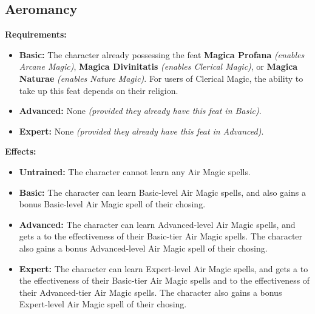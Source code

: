 \subsection{Aeromancy}
\begin{table}[!ht]
\centering
{}
\end{table}
\textbf{Requirements:}
\begin{itemize}
	\item \textbf{Basic:} The character already possessing the feat \textbf{Magica Profana} \textit{(enables Arcane Magic)}, \textbf{Magica Divinitatis} \textit{(enables Clerical Magic)}, or \textbf{Magica Naturae} \textit{(enables Nature Magic)}. For users of Clerical Magic, the ability to take up this feat depends on their religion.
	\item \textbf{Advanced:} None \textit{(provided they already have this feat in Basic)}.
	\item \textbf{Expert:} None \textit{(provided they already have this feat in Advanced)}.
\end{itemize}
\textbf{Effects:}
\begin{itemize}
	\item \textbf{Untrained:} The character cannot learn any Air Magic spells.
	\item \textbf{Basic:} The character can learn Basic-level Air Magic spells, and also gains a bonus Basic-level Air Magic spell of their chosing.
	\item \textbf{Advanced:} The character can learn Advanced-level Air Magic spells, and gets a  to the effectiveness of their Basic-tier Air Magic spells. The character also gains a bonus Advanced-level Air Magic spell of their chosing.
	\item \textbf{Expert:} The character can learn Expert-level Air Magic spells, and gets a  to the effectiveness of their Basic-tier Air Magic spells and  to the effectiveness of their Advanced-tier Air Magic spells. The character also gains a bonus Expert-level Air Magic spell of their chosing.
\end{itemize}\newpage
